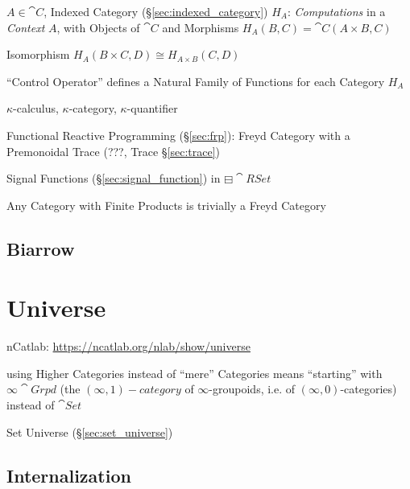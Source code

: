 $A \in \cat{C}$, Indexed Category (\S\ref{sec:indexed_category})
$H_A$: \emph{Computations} in a \emph{Context} $A$, with Objects of
$\cat{C}$ and Morphisms $H_A(B,C) = \cat{C}(A \times B, C)$

Isomorphism $H_A(B \times C, D) \cong H_{A \times B} (C,D)$

``Control Operator'' defines a Natural Family of Functions for each
Category $H_A$
\cite{paterson01}

$\kappa$-calculus, $\kappa$-category, $\kappa$-quantifier %

Functional Reactive Programming (\S\ref{sec:frp}): Freyd Category with
a Premonoidal Trace (???, Trace \S\ref{sec:trace})

Signal Functions (\S\ref{sec:signal_function}) in
$\boxminus\cat{RSet}$ \cite{jeffrey12}

Any Category with Finite Products is trivially a Freyd Category
\cite{jeffrey12}



\subsection{Biarrow}\label{sec:biarrow}



\section{Universe}\label{sec:category_universe}

nCatlab: \url{https://ncatlab.org/nlab/show/universe}

using Higher Categories instead of ``mere'' Categories means
``starting'' with $\infty\cat{Grpd}$ (the $(\infty,1)-category$ of
$\infty$-groupoids, i.e. of $(\infty,0)$-categories) instead of
$\cat{Set}$

\fist Set Universe (\S\ref{sec:set_universe})




\subsection{Internalization}\label{sec:internalization}


